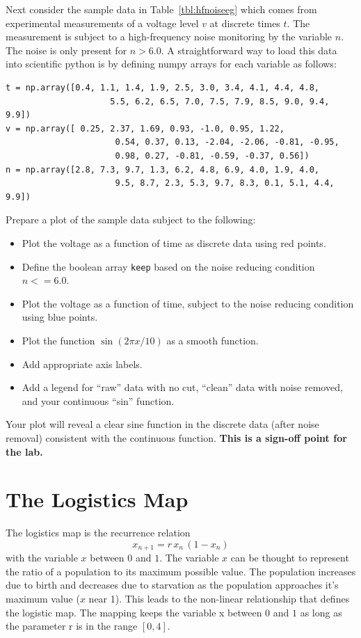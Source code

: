 Next consider the sample data in Table~\ref{tbl:hfnoiseeg} which comes
from experimental measurements of a voltage level $v$ at discrete
times $t$.  The measurement is subject to a high-frequency noise
monitoring by the variable $n$.  The noise is only present for $n >
6.0$.  A straightforward way to load this data into scientific python
is by defining numpy arrays for each variable as follows:
\begin{verbatim}
t = np.array([0.4, 1.1, 1.4, 1.9, 2.5, 3.0, 3.4, 4.1, 4.4, 4.8, 
                     5.5, 6.2, 6.5, 7.0, 7.5, 7.9, 8.5, 9.0, 9.4, 9.9])
v = np.array([ 0.25, 2.37, 1.69, 0.93, -1.0, 0.95, 1.22,   
                      0.54, 0.37, 0.13, -2.04, -2.06, -0.81, -0.95,  
                      0.98, 0.27, -0.81, -0.59, -0.37, 0.56])
n = np.array([2.8, 7.3, 9.7, 1.3, 6.2, 4.8, 6.9, 4.0, 1.9, 4.0,  
                      9.5, 8.7, 2.3, 5.3, 9.7, 8.3, 0.1, 5.1, 4.4, 9.9])
\end{verbatim}

\noindent
\begin{plot} \end{plot}
Prepare a plot of the sample data subject to the following:
\begin{itemize}
 \item Plot the voltage as a function of time as discrete data using red points.
 \item Define the boolean array {\tt keep} based on the noise reducing condition $n<=6.0$.
 \item Plot the voltage as a function of time, subject to the noise reducing condition using blue points.
 \item Plot the function $\sin(2 \pi x / 10)$ as a smooth function.
 \item Add appropriate axis labels.
 \item Add a legend for ``raw'' data with no cut, ``clean'' data with noise removed, and your continuous ``sin'' function.   
\end{itemize}
Your plot will reveal a clear sine function in the discrete data
(after noise removal) consistent with the continuous function.  {\bf
  This is a sign-off point for the lab.}

\section{The Logistics Map}
The logistics map is the recurrence relation
\begin{displaymath}
x_{n+1} = r \, x_n \, (1 - x_n)
\end{displaymath}
with the variable $x$ between $0$ and $1$.  The variable $x$ can be
thought to represent the ratio of a population to its maximum possible
value.  The population increases due to birth and decreases due to
starvation as the population approaches it's maximum value ($x$ near
1).  This leads to the non-linear relationship that defines the
logistic map.  The mapping keeps the variable x between $0$ and $1$ as
long as the parameter r is in the range $[0,4]$.

